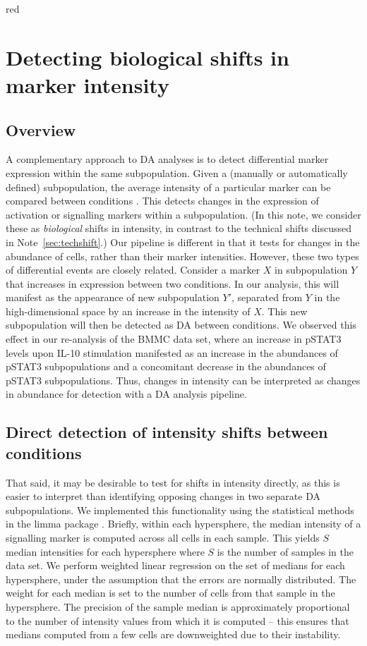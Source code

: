 \documentclass{article}
\begin{document}
\begin{color}{red}
\section{Detecting biological shifts in marker intensity}

\subsection{Overview}
A complementary approach to DA analyses is to detect differential marker expression within the same subpopulation.
Given a (manually or automatically defined) subpopulation, the average intensity of a particular marker can be compared between conditions \cite{behbehani2015mass,anchang2016visualization}.
This detects changes in the expression of activation or signalling markers within a subpopulation.
(In this note, we consider these as \textit{biological} shifts in intensity, in contrast to the technical shifts discussed in Note~\ref{sec:techshift}.)
Our pipeline is different in that it tests for changes in the abundance of cells, rather than their marker intensities.
However, these two types of differential events are closely related.
Consider a marker $X$ in subpopulation $Y$ that increases in expression between two conditions. 
In our analysis, this will manifest as the appearance of new subpopulation $Y'$, separated from $Y$ in the high-dimensional space by an increase in the intensity of $X$.
This new subpopulation will then be detected as DA between conditions.
We observed this effect in our re-analysis of the BMMC data set, where an increase in pSTAT3 levels upon IL-10 stimulation manifested as an increase in the abundances of pSTAT3\hi{} subpopulations and a concomitant decrease in the abundances of pSTAT3\lo{} subpopulations.
Thus, changes in intensity can be interpreted as changes in abundance for detection with a DA analysis pipeline.

\subsection{Direct detection of intensity shifts between conditions}
That said, it may be desirable to test for shifts in intensity directly, as this is easier to interpret than identifying opposing changes in two separate DA subpopulations.
We implemented this functionality using the statistical methods in the limma package \cite{smyth2004linear}.
Briefly, within each hypersphere, the median intensity of a signalling marker is computed across all cells in each sample.
This yields $S$ median intensities for each hypersphere where $S$ is the number of samples in the data set.
We perform weighted linear regression on the set of medians for each hypersphere, under the assumption that the errors are normally distributed.
The weight for each median is set to the number of cells from that sample in the hypersphere.
The precision of the sample median is approximately proportional to the number of intensity values from which it is computed \cite{rider1960variance} -- this ensures that medians computed from a few cells are downweighted due to their instability.


\end{color}
\end{document}
